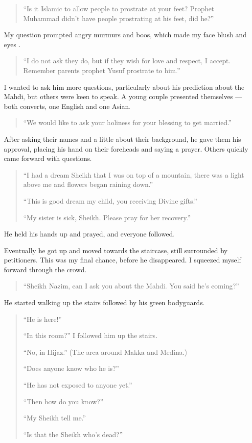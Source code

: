 \documentclass[12pt]{memoir}
\begin{document}
\begin{quote}
“Is it Islamic to allow people to prostrate at your feet?
Prophet Muhammad didn’t have people prostrating at his feet, did he?”
\end{quote}

My question prompted angry murmurs and boos,
which made my face blush and eyes .

\begin{quote}
“I do not ask they do, but if they wish for love and respect, I accept.
Remember parents prophet Yusuf prostrate to him.”
\end{quote}

I wanted to ask him more questions,
particularly about his prediction about the Mahdi,
but others were keen to speak.
A young couple presented themselves —
both converts, one English and one Asian.

\begin{quote}
“We would like to ask your holiness for your blessing to get married.”
\end{quote}

After asking their names and a little about their background,
he gave them his approval,
placing his hand on their foreheads and saying a prayer.
Others quickly came forward with questions.

\begin{quote}
“I had a dream Sheikh that I was on top of a mountain,
there was a light above me and flowers began raining down.”

“This is good dream my child, you receiving Divine gifts.”

“My sister is sick, Sheikh. Please pray for her recovery.”
\end{quote}

He held his hands up and prayed, and everyone followed.

Eventually he got up and moved towards the staircase,
still surrounded by petitioners.
This was my final chance, before he disappeared.
I squeezed myself forward through the crowd.

\begin{quote}
“Sheikh Nazim, can I ask you about the Mahdi. You said he’s coming?”
\end{quote}

He started walking up the stairs followed by his green bodyguards.

\begin{quote}
“He is here!”

“In this room?” I followed him up the stairs.

“No, in Hijaz.” (The area around Makka and Medina.)

“Does anyone know who he is?”

“He has not exposed to anyone yet.”

“Then how do you know?”

“My Sheikh tell me.”

“Is that the Sheikh who’s dead?”
\end{quote}
\end{document}
